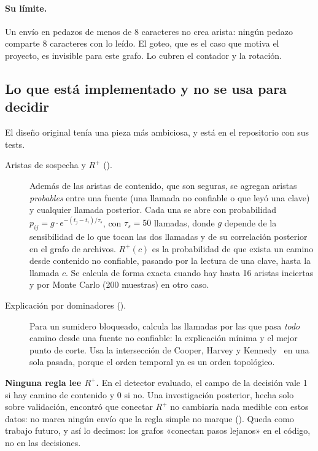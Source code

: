 \paragraph{Su límite.} Un envío en pedazos de menos de 8 caracteres no crea arista: ningún pedazo
comparte 8 caracteres con lo leído. El goteo, que es el caso que motiva el proyecto, es invisible para
este grafo. Lo cubren el contador y la rotación.

\subsection{Lo que está implementado y no se usa para decidir}\label{sec:no-conectado}

El diseño original tenía una pieza más ambiciosa, y está en el repositorio con sus tests.

\begin{description}
  \item[Aristas de sospecha y $R^{+}$ ().] Además de las aristas de contenido, que
    son seguras, se agregan aristas \emph{probables} entre una fuente (una llamada no confiable o que
    leyó una clave) y cualquier llamada posterior. Cada una se abre con probabilidad
    $p_{ij} = g \cdot e^{-(t_j - t_i)/\tau_s}$, con $\tau_s = 50$ llamadas, donde $g$ depende de la
    sensibilidad de lo que tocan las dos llamadas y de su correlación posterior en el grafo de
    archivos. $R^{+}(c)$ es la probabilidad de que exista un camino desde contenido no confiable,
    pasando por la lectura de una clave, hasta la llamada $c$. Se calcula de forma exacta cuando hay
    hasta 16 aristas inciertas y por Monte Carlo (200 muestras) en otro caso.
  \item[Explicación por dominadores ().] Para un sumidero bloqueado, calcula las
    llamadas por las que pasa \emph{todo} camino desde una fuente no confiable: la explicación mínima y
    el mejor punto de corte. Usa la intersección de Cooper, Harvey y Kennedy~\cite{chk} en una sola
    pasada, porque el orden temporal ya es un orden topológico.
\end{description}

\begin{limite}
\textbf{Ninguna regla lee $R^{+}$.} En el detector evaluado, el campo  de la decisión vale
1 si hay camino de contenido y 0 si no. Una investigación posterior, hecha solo sobre validación,
encontró que conectar $R^{+}$ no cambiaría nada medible con estos datos: no marca ningún envío que la
regla simple no marque (). Queda como trabajo futuro, y así lo decimos:
los grafos «conectan pasos lejanos» en el código, no en las decisiones.
\end{limite}
